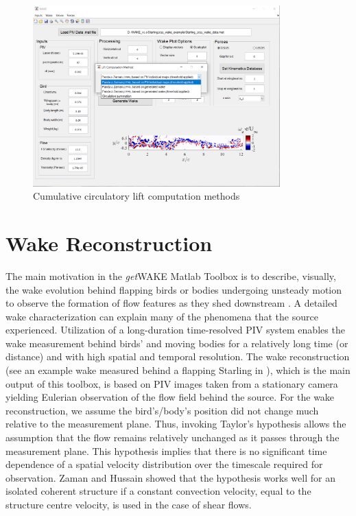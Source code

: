 \documentclass[12pt,a4paper]{article}
\begin{document}
\begin{figure}[ht!]
	\centering
	\includegraphics[width=0.85\textwidth]{Lift-comp-methods}
	\caption{Cumulative circulatory lift computation methods}
	\label{fig:GUI-Lift-comp-methods}
\end{figure}


\section{Wake Reconstruction}
The main motivation in the \textit{get}WAKE Matlab Toolbox is to describe, visually, the wake evolution behind flapping birds or bodies undergoing unsteady motion to observe the formation of flow features as they shed downstream \cite{Ben-Gida2013,Nafi2020,Stalnov2015,Gurka2017,Lawley2019}. 
A detailed wake characterization can explain many of the phenomena that the source experienced. 
Utilization of a long-duration time-resolved PIV system enables the wake measurement behind birds' and moving bodies for a relatively long time (or distance) and with high spatial and temporal resolution. 
The wake reconstruction (see an example wake measured behind a flapping Starling in ), which is the main output of this toolbox, is based on PIV images taken from a stationary camera yielding Eulerian observation of the flow field behind the source. 
For the wake reconstruction, we assume the bird's/body's position did not change much relative to the measurement plane. 
Thus, invoking Taylor's hypothesis \cite{Taylor1938} allows the assumption that the flow remains relatively unchanged as it passes through the measurement plane. This hypothesis implies that there is no significant time dependence of a spatial velocity distribution over the timescale required for observation. 
Zaman and Hussain \cite{Zaman1981} showed that the hypothesis works well for an isolated coherent structure if a constant convection velocity, equal to the structure centre velocity, is used in the case of shear flows. 
\end{document}
